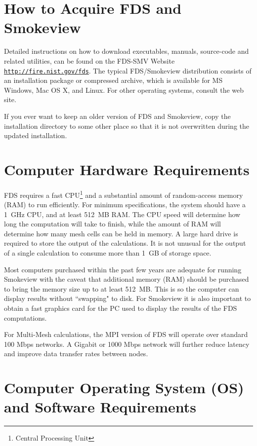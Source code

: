 \documentclass[11pt]{book}
\newcommand{\ct}{\tt\small}
\begin{document}
\section{How to Acquire FDS and Smokeview}
\label{info:acquire}
Detailed instructions on how to download executables, manuals, source-code and related utilities,
can be found on the FDS-SMV Website
\href{http://fire.nist.gov/fds}{{\ct http://fire.nist.gov/fds}}.
The typical FDS/Smokeview distribution consists of an installation package or compressed archive,
which is available for MS Windows, Mac OS X, and Linux.
For other operating systems, consult the web site.

\begin{warning}
\noindent
If you ever want to keep an older version of FDS and Smokeview, copy the installation directory to some other
place so that it is not overwritten during the updated installation.
\end{warning}

\section{Computer Hardware Requirements}

FDS requires a fast CPU\footnote{Central Processing Unit} and a substantial amount of random-access memory (RAM) to run efficiently.
For minimum specifications, the system should have a 1~GHz CPU, and at least 512~MB RAM.
The CPU speed will determine how long the computation will take to finish, while the amount
of RAM will determine how many mesh cells can be held in memory.
A large hard drive is required to store the output of the calculations. It is not unusual for
the output of a single calculation to consume more than 1~GB of storage space.

Most computers purchased within the past few years are adequate for running Smokeview
with the caveat that additional memory (RAM) should be purchased to bring the
memory size up to at least 512~MB. This is so the computer can display results without
``swapping" to disk. For Smokeview it is also important to obtain a fast graphics card
for the PC used to display the results of the FDS computations.

For Multi-Mesh calculations, the MPI version of FDS will operate over standard 100 Mbps networks.
A Gigabit or 1000 Mbps network will further reduce latency and improve data transfer rates between nodes.


\section{Computer Operating System (OS) and Software Requirements}
\end{document}

